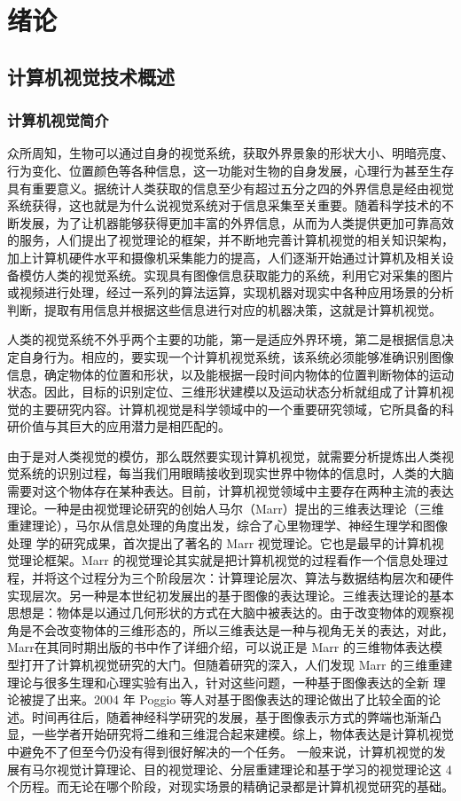 
\chapter{绪论}
\section{计算机视觉技术概述}
\subsection{计算机视觉简介}
众所周知，生物可以通过自身的视觉系统，获取外界景象的形状大小、明暗亮度、行为变化、位置颜色等各种信息，这一功能对生物的自身发展，心理行为甚至生存具有重要意义。据统计人类获取的信息至少有超过五分之四的外界信息是经由视觉系统获得，这也就是为什么说视觉系统对于信息采集至关重要。随着科学技术的不断发展，为了让机器能够获得更加丰富的外界信息，从而为人类提供更加可靠高效的服务，人们提出了视觉理论的框架，并不断地完善计算机视觉的相关知识架构，加上计算机硬件水平和摄像机采集能力的提高，人们逐渐开始通过计算机及相关设备模仿人类的视觉系统。实现具有图像信息获取能力的系统，利用它对采集的图片或视频进行处理，经过一系列的算法运算，实现机器对现实中各种应用场景的分析判断，提取有用信息并根据这些信息进行对应的机器决策，这就是计算机视觉。

人类的视觉系统不外乎两个主要的功能，第一是适应外界环境，第二是根据信息决定自身行为。相应的，要实现一个计算机视觉系统，该系统必须能够准确识别图像信息，确定物体的位置和形状，以及能根据一段时间内物体的位置判断物体的运动状态。因此，目标的识别定位、三维形状建模以及运动状态分析就组成了计算机视觉的主要研究内容。计算机视觉是科学领域中的一个重要研究领域，它所具备的科研价值与其巨大的应用潜力是相匹配的。

由于是对人类视觉的模仿，那么既然要实现计算机视觉，就需要分析提炼出人类视觉系统的识别过程，每当我们用眼睛接收到现实世界中物体的信息时，人类的大脑需要对这个物体存在某种表达。目前，计算机视觉领域中主要存在两种主流的表达理论。一种是由视觉理论研究的创始人马尔（Marr）提出的三维表达理论（三维重建理论），马尔从信息处理的角度出发，综合了心里物理学、神经生理学和图像处理
学的研究成果，首次提出了著名的 Marr 视觉理论。它也是最早的计算机视觉理论框架。Marr 的视觉理论其实就是把计算机视觉的过程看作一个信息处理过程，并将这个过程分为三个阶段层次：计算理论层次、算法与数据结构层次和硬件实现层次。另一种是本世纪初发展出的基于图像的表达理论。三维表达理论的基本思想是：物体是以通过几何形状的方式在大脑中被表达的。由于改变物体的观察视角是不会改变物体的三维形态的，所以三维表达是一种与视角无关的表达，对此，Marr在其同时期出版的书中作了详细介绍，可以说正是 Marr 的三维物体表达模型打开了计算机视觉研究的大门。但随着研究的深入，人们发现 Marr  的三维重建理论与很多生理和心理实验有出入，针对这些问题，一种基于图像表达的全新
理论被提了出来。2004 年 Poggio  等人对基于图像表达的理论做出了比较全面的论述。时间再往后，随着神经科学研究的发展，基于图像表示方式的弊端也渐渐凸显，一些学者开始研究将二维和三维混合起来建模。综上，物体表达是计算机视觉中避免不了但至今仍没有得到很好解决的一个任务。 一般来说，计算机视觉的发展有马尔视觉计算理论、目的视觉理论、分层重建理论和基于学习的视觉理论这 4 个历程。而无论在哪个阶段，对现实场景的精确记录都是计算机视觉研究的基础。

